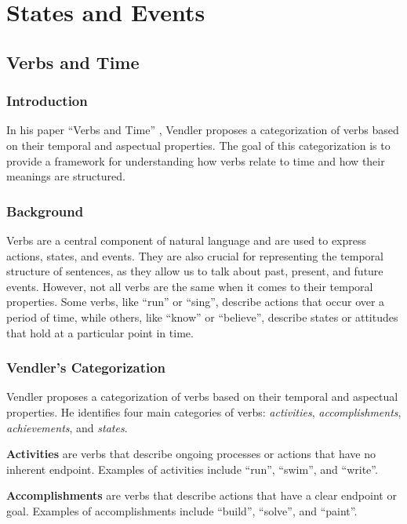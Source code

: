 \chapter{States and Events}
\section{Verbs and Time}
\subsection{Introduction}

In his paper ``Verbs and Time'' \cite{vendler1957verbs}, Vendler proposes a categorization of verbs based on their temporal and aspectual properties. The goal of this categorization is to provide a framework for understanding how verbs relate to time and how their meanings are structured.

\subsection{Background}

Verbs are a central component of natural language and are used to express actions, states, and events. They are also crucial for representing the temporal structure of sentences, as they allow us to talk about past, present, and future events. However, not all verbs are the same when it comes to their temporal properties. Some verbs, like ``run'' or ``sing'', describe actions that occur over a period of time, while others, like ``know'' or ``believe'', describe states or attitudes that hold at a particular point in time.

\subsection{Vendler's Categorization}

Vendler proposes a categorization of verbs based on their temporal and aspectual properties. He identifies four main categories of verbs: \textit{activities}, \textit{accomplishments}, \textit{achievements}, and \textit{states}.

\textbf{Activities} are verbs that describe ongoing processes or actions that have no inherent endpoint. Examples of activities include ``run'', ``swim'', and ``write''.


\textbf{Accomplishments} are verbs that describe actions that have a clear endpoint or goal. Examples of accomplishments include ``build'', ``solve'', and ``paint''.


